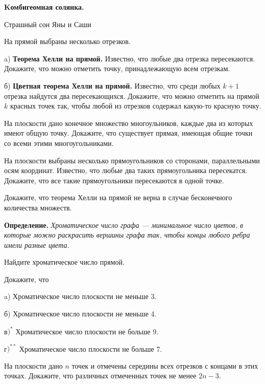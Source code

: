 \centerline{\bf \Huge Kомбигеомная солянка.}

\begin{flushright}
        \scriptsize{Страшный сон Яны и Саши}
\end{flushright}

На прямой выбраны несколько отрезков.

a) \textbf{Теорема Хелли на прямой.} Известно, что любые два отрезка пересекаются. Докажите, что можно отметить точку, принадлежающую всем отрезкам.

б) \textbf{Цветная теорема Хелли на прямой.}  Известно, что среди любых $k + 1$ отрезка найдутся два пересекающихся. Докажите, что можно отметить на прямой $k$ красных точек так, чтобы любой из отрезков содержал какую-то красную точку.

На плоскости дано конечное множество многоульников, каждые два из которых имеют общую точку. Докажите, что существует прямая, имеющая общие точки со всеми этими многоугольниками.

На плоскости выбраны несколько прямоугольников со сторонами, параллельными осям координат. Известно, что любые два таких прямоугольника пересекатся. Докажите, что все такие прямоугольники пересекаются в одной точке.

 Докажите, что теорема Хелли на прямой не верна в случае бесконечного количества множеств.

\textbf{Определение.} \textit{Хроматическое число графа — минимальное число цветов, в которые можно раскрасить вершины графа так, чтобы концы любого ребра имели разные цвета.}

Найдите хроматическое число прямой.

Докажите, что

a) Хроматическое число плоскости не меньше 3.

б) Хроматическое число плоскости не меньше 4.

в$)^*$ Хроматическое число плоскости не больше 9.

г$)^{**}$ Хроматическое число плоскости не больше 7.

На плоскости дано $n$ точек и отмечены середины всех отрезков с концами в этих точках. Докажите, что различных отмеченных точек не менее $2n - 3.$